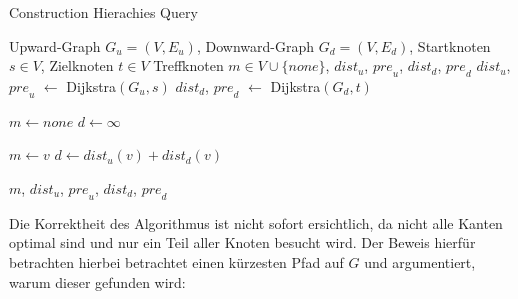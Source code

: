 \begin{algorithm}[ht]
    \caption{Construction Hierachies Query}
    \begin{algorithmic}[1]
        \Require Upward-Graph $G_u = (V, E_u)$, Downward-Graph $G_d = (V, E_d)$, Startknoten $s \in V$, Zielknoten $t \in V$
        \Ensure Treffknoten $m \in V \cup \{ {none} \}$, ${dist}_u$, ${pre}_u$, ${dist}_d$, ${pre}_d$
        \State ${dist}_u$, ${pre}_u$ $\leftarrow$ Dijkstra$(G_u, s)$
        \State ${dist}_d$, ${pre}_d$ $\leftarrow$ Dijkstra$(G_d, t)$

        \State
        \State $m \leftarrow {none}$
        \State $d \leftarrow \infty$
        \State

        \State $m \leftarrow v$
        \State $d \leftarrow {dist}_u(v) + {dist}_d(v)$
        \EndIf
        \EndFor

        \State
        \State \Return $m$, ${dist}_u$, ${pre}_u$, ${dist}_d$, ${pre}_d$
    \end{algorithmic}
    \label{ch:query_simple}
\end{algorithm}

Die Korrektheit des Algorithmus ist nicht sofort ersichtlich, da nicht alle Kanten optimal sind und nur ein Teil aller Knoten besucht wird.
Der Beweis hierfür betrachten hierbei betrachtet einen kürzesten Pfad auf $G$ und argumentiert, warum dieser gefunden wird:


